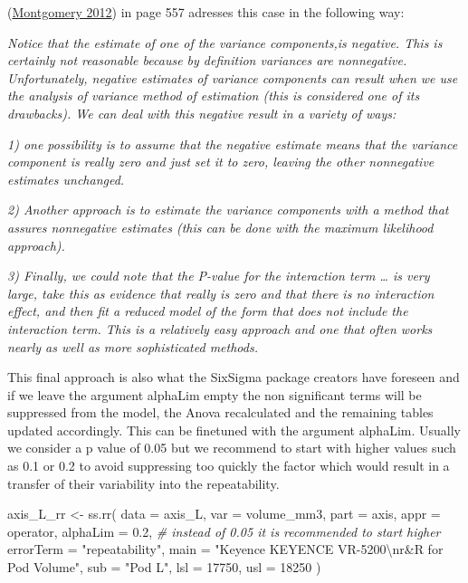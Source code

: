 \documentclass[
]{book}
\newenvironment{Shaded}{\begin{snugshade}}{\end{snugshade}}
\newcommand{\AttributeTok}[1]{\textcolor[rgb]{0.77,0.63,0.00}{#1}}
\newcommand{\CommentTok}[1]{\textcolor[rgb]{0.56,0.35,0.01}{\textit{#1}}}
\newcommand{\DecValTok}[1]{\textcolor[rgb]{0.00,0.00,0.81}{#1}}
\newcommand{\FloatTok}[1]{\textcolor[rgb]{0.00,0.00,0.81}{#1}}
\newcommand{\FunctionTok}[1]{\textcolor[rgb]{0.00,0.00,0.00}{#1}}
\newcommand{\NormalTok}[1]{#1}
\newcommand{\OtherTok}[1]{\textcolor[rgb]{0.56,0.35,0.01}{#1}}
\newcommand{\SpecialCharTok}[1]{\textcolor[rgb]{0.00,0.00,0.00}{#1}}
\newcommand{\StringTok}[1]{\textcolor[rgb]{0.31,0.60,0.02}{#1}}
\begin{document}
(\protect\hyperlink{ref-Montgomery2012}{Montgomery 2012}) in page 557 adresses this case in the following way:

\emph{Notice that the estimate of one of the variance components,is negative. This is certainly not reasonable because by definition variances are nonnegative. Unfortunately, negative estimates of variance components can result when we use the analysis of variance method of estimation (this is considered one of its drawbacks). We can deal with this negative result in a variety of ways:}

\emph{1) one possibility is to assume that the negative estimate means that the variance component is really zero and just set it to zero, leaving the other nonnegative estimates unchanged.}

\emph{2) Another approach is to estimate the variance components with a method that assures nonnegative estimates (this can be done with the maximum likelihood approach).}

\emph{3) Finally, we could note that the P-value for the interaction term \ldots{} is very large, take this as evidence that really is zero and that there is no interaction effect, and then fit a reduced model of the form that does not include the interaction term. This is a relatively easy approach and one that often works nearly as well as more sophisticated methods.}

This final approach is also what the SixSigma package creators have foreseen and if we leave the argument alphaLim empty the non significant terms will be suppressed from the model, the Anova recalculated and the remaining tables updated accordingly. This can be finetuned with the argument alphaLim. Usually we consider a p value of 0.05 but we recommend to start with higher values such as 0.1 or 0.2 to avoid suppressing too quickly the factor which would result in a transfer of their variability into the repeatability.

\begin{Shaded}
\begin{Highlighting}[]
\NormalTok{axis\_L\_rr }\OtherTok{\textless{}{-}} \FunctionTok{ss.rr}\NormalTok{(}
  \AttributeTok{data =}\NormalTok{ axis\_L, }
  \AttributeTok{var =}\NormalTok{ volume\_mm3, }
  \AttributeTok{part =}\NormalTok{ axis, }
  \AttributeTok{appr =}\NormalTok{ operator, }
  \AttributeTok{alphaLim =} \FloatTok{0.2}\NormalTok{, }\CommentTok{\# instead of 0.05 it is recommended to start higher}
  \AttributeTok{errorTerm =} \StringTok{"repeatability"}\NormalTok{,}
  \AttributeTok{main =} \StringTok{"Keyence KEYENCE VR{-}5200}\SpecialCharTok{\textbackslash{}n}\StringTok{r\&R for Pod Volume"}\NormalTok{,}
  \AttributeTok{sub =} \StringTok{"Pod L"}\NormalTok{,}
  \AttributeTok{lsl =} \DecValTok{17750}\NormalTok{,}
  \AttributeTok{usl =} \DecValTok{18250}
\NormalTok{)}
\end{Highlighting}
\end{Shaded}
\end{document}

